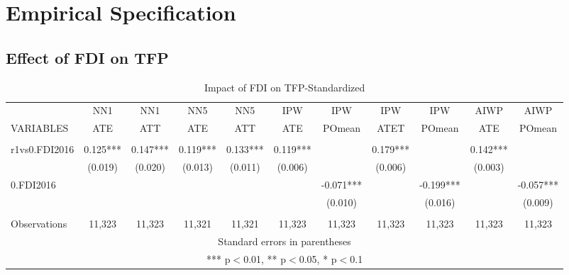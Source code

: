 \documentclass[a4paper,11pt]{scrartcl}
\begin{document}
\section{Empirical Specification}

\subsection{Effect of FDI on TFP}

\begin{table}[htbp]\centering
\caption{Impact of FDI on TFP-Standardized}
\tiny
\begin{tabular}{lcccccccccc} \hline
 & NN1 & NN1 & NN5 & NN5 & IPW & IPW & IPW & IPW & AIWP & AIWP \\
VARIABLES & ATE & ATT & ATE& ATT & ATE & POmean & ATET & POmean & ATE & POmean \\ \hline
 &  &  &  &  &  &  &  &  &  &  \\
r1vs0.FDI2016 & 0.125*** & 0.147*** & 0.119*** & 0.133*** & 0.119*** &  & 0.179*** &  & 0.142*** &  \\
 & (0.019) & (0.020) & (0.013) & (0.011) & (0.006) &  & (0.006) &  & (0.003) &  \\
0.FDI2016 &  &  &  &  &  & -0.071*** &  & -0.199*** &  & -0.057*** \\
 &  &  &  &  &  & (0.010) &  & (0.016) &  & (0.009) \\
 &  &  &  &  &  &  &  &  &  &  \\
 Observations & 11,323 & 11,323 & 11,321 & 11,321 & 11,323 & 11,323 & 11,323 & 11,323 & 11,323 & 11,323 \\ \hline
\multicolumn{11}{c}{ Standard errors in parentheses} \\
\multicolumn{11}{c}{ *** p$<$0.01, ** p$<$0.05, * p$<$0.1} \\
\end{tabular}
\end{table}
\end{document}
